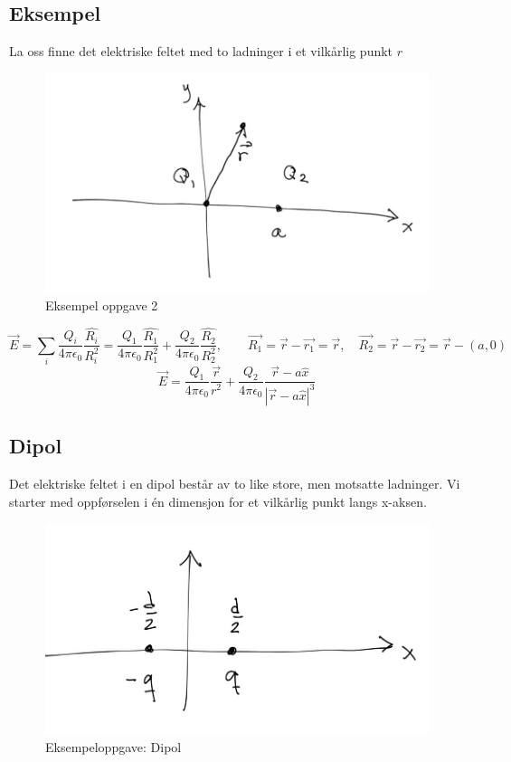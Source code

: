   \subsection*{Eksempel }
    La oss finne det elektriske feltet med to ladninger i et vilkårlig punkt $ r $
    \begin{figure}[h!]
      \centering
      \includegraphics[scale = .7]{Bilder/Eksempel_Krefter_paa_ladning.png}
      \caption{Eksempel oppgave 2}
      \label{fig:EksempelOppgave2}
    \end{figure}
  \[
  \vec{E} = ∑ \limits_{i}^{} \frac{Q_i }{4 π \epsilon_0} \frac{\hat{R_i}}{R_i^{2}} = \frac{Q_1 }{4 π \epsilon_0} \frac{\hat{R_1}}{R_1^{2}} + \frac{Q_2 }{4 π \epsilon_0} \frac{\hat{R_2}}{R_2^{2}}, \qquad \vec{R_1} = \vec{r} - \vec{r_1} = \vec{r}, \quad \vec{R_2} = \vec{r} - \vec{r_2} = \vec{r} - (a,0)
  \]
  \[
  \vec{E} = \frac{Q_1 }{4 π \epsilon_0} \frac{\vec{r}}{r^{2}} + \frac{Q_2 }{4 π \epsilon_0} \frac{\vec{r} - a \hat{x}}{\left|\vec{r} - a \hat{x}\right|^{3}}
  \]

  \subsection*{Dipol}
    Det elektriske feltet i en dipol består av to like store, men motsatte ladninger. Vi starter med oppførselen i én dimensjon for et vilkårlig punkt langs x-aksen.
    \begin{figure}[h!]
      \centering
      \includegraphics[scale = .4]{Bilder/Eksempel_Dipol.png}
      \caption{Eksempeloppgave: Dipol }
      \label{fig:EksempelOppgave3}
    \end{figure}

